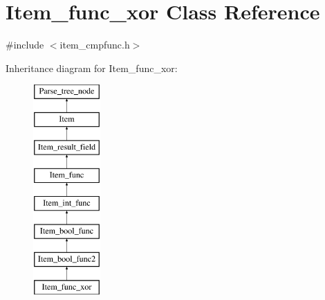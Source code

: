 \hypertarget{classItem__func__xor}{}\section{Item\+\_\+func\+\_\+xor Class Reference}
\label{classItem__func__xor}


{\ttfamily \#include $<$item\+\_\+cmpfunc.\+h$>$}

Inheritance diagram for Item\+\_\+func\+\_\+xor\+:\begin{figure}[H]
\begin{center}
\leavevmode
\includegraphics[height=8.000000cm]{classItem__func__xor}
\end{center}
\end{figure}
